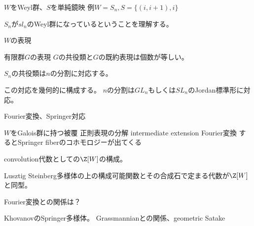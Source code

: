 \documentclass[dvipdfmx]{beamer}
\begin{document}
\begin{frame}
$W$をWeyl群、$S$を単純鏡映
例$W=S_n, S=\{(i,i+1),i\}$

$S_n$が$sl_n$のWeyl群になっているということを理解する。

$W$の表現

有限群$G$の表現
$G$の共役類と$G$の既約表現は個数が等しい。

$S_n$の共役類は$n$の分割に対応する。

この対応を幾何的に構成する。
$n$の分割は$GL_n$もしくは$SL_n$のJordan標準形に対応。
\end{frame}

\begin{frame}
Fourier変換、Springer対応

$W$をGalois群に持つ被覆
正則表現の分解
intermediate extension
Fourier変換
するとSpringer fiberのコホモロジーが出てくる
\end{frame}

\begin{frame}
convolution代数としての$\Z[W]$の構成。

Lusztig
Steinberg多様体の上の構成可能関数とその合成石で定まる代数が$\Z[W]$と同型。

Fourier変換との関係は？
\end{frame}

\begin{frame}
KhovanovのSpringer多様体。
Grassmannianとの関係、geometric Satake
\end{frame}
\end{document}
